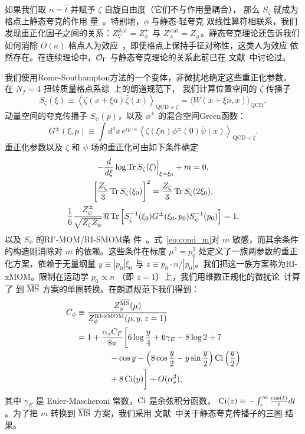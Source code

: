 如果我们取 $n=\hat t$ 并赋予 $\zeta$ 自旋自由度（它们不与作用量耦合），
那么 $S_\zeta$ 就成为格点上静态夸克的作用
量~\cite{Eichten:1989zv,Sommer:2010ic}。特别地，$\phi$ 与静态-轻夸克
双线性算符相联系，我们发现重正化因子之间的关系：$Z_V^\text{stat}=Z_\phi^+$
与 $Z_A^\text{stat}=Z_\phi^-$。静态夸克理论还告诉我们如何消除 $O(a)$
格点人为效应~\cite{Kurth:2000ki}，即使格点上保持手征对称性，这类人为效应
依然存在。在连续理论中，$\mathcal{O}_\Gamma$ 与静态夸克理论的关系此前已在
文献~\cite{Ji:2015jwa}中讨论过。

我们使用Rome-Southampton方法的一个变体，非微扰地确定这些重正化参数。
在 $N_f=4$ 扭转质量格点系综~\cite{Alexandrou:2015sea}上的朗道规范下，
我们计算位置空间的 $\zeta$ 传播子
\begin{equation}
  S_\zeta(\xi) \equiv \left\langle \zeta(x+\xi n)\bar\zeta(x)\right\rangle_{\text{QCD}+\zeta}
  = \bigl\langle W(x+\xi n,x)\bigr\rangle_\text{QCD},
\end{equation}
动量空间的夸克传播子 $S_\psi(p)$，以及 $\phi^\pm$ 的混合空间Green函数：
\begin{equation}
  G^\pm(\xi,p) \equiv
  \int d^4x\, e^{ip\cdot x}\left\langle
  \zeta(\xi n)\phi^{\pm}(0)\bar\psi(x)\right\rangle_{\text{QCD}+\zeta}.
\end{equation}
重正化参数以及 $\zeta$ 和 $\psi$ 场的重正化可由如下条件确定
\begin{gather}
  -\frac{d}{d\xi}\log\operatorname{Tr} S_\zeta(\xi)\Bigr|_{\xi=\xi_0} + m=0,\label{eq:cond_m}\\
\left[\frac{Z_\zeta}{3}\operatorname{Tr} S_\zeta(\xi_0)\right]^2=\frac{Z_\zeta}{3}\operatorname{Tr} S_\zeta(2\xi_0),\label{eq:cond_zeta}\\
\frac{1}{6}\frac{Z_\phi^\pm}{\sqrt{Z_\zeta Z_\psi}}\Re\operatorname{Tr}\left[S_\zeta^{-1}(\xi_0)G^\pm(\xi_0,p_0)S_\psi^{-1}(p_0)\right]=1,\label{eq:cond_phi}
\end{gather}
以及 $S_\psi$ 的RI$'$-MOM/RI-SMOM条
件~\cite{Martinelli:1994ty,Sturm:2009kb}。式~\eqref{eq:cond_m}对 $m$
敏感，而其余条件的构造则消除对 $m$ 的依赖。这些条件在标度 $\mu^2=p_0^2$
处定义了一族两参数的重正化方案，依赖于无量纲量 $y\equiv|p_0|\xi_0$ 与
$z\equiv p_0\cdot
n/|p_0|$。我们把这一族方案称为RI-xMOM。限制在运动学 $p_0\propto n$
（即 $z=1$）上，我们用维数正规化的微扰论~\cite{Green_forthcoming}计算了
到 $\overline{\text{MS}}$ 方案的单圈转换。在朗道规范下我们得到：
\begin{equation}
\begin{aligned}\label{eq:conversion}
   C_\phi &\equiv \frac{Z_\phi^{\overline{\text{MS}}}(\mu)}{Z_\phi^\text{RI-xMOM}(\mu,y,z=1)} \\
&= 1
+ \frac{\alpha_s C_F}{8\pi}\biggl[
  6\log\frac{y}{4}
  + 6\gamma_E - 8\log 2 + 7 \\
&\qquad\qquad - \cos y - \left(8\cos\frac{y}{2} - y\sin\frac{y}{2}\right)
\operatorname{Ci}\left(\frac{y}{2}\right) \\
&\qquad\qquad + 8\operatorname{Ci}(y)\biggr] + O(\alpha_s^2),
\end{aligned}
\end{equation}
其中 $\gamma_E$ 是 Euler-Mascheroni 常数，$\operatorname{Ci}$ 是余弦积分函数，
$\operatorname{Ci}(z) \equiv -\int_z^\infty
\frac{\cos(t)}{t} dt$。为了把 $m$ 转换到 $\overline{\text{MS}}$ 方案，我们采用
文献~\cite{Chetyrkin:2003vi,Melnikov:2000zc}中关于静态夸克传播子的三圈
结果。

